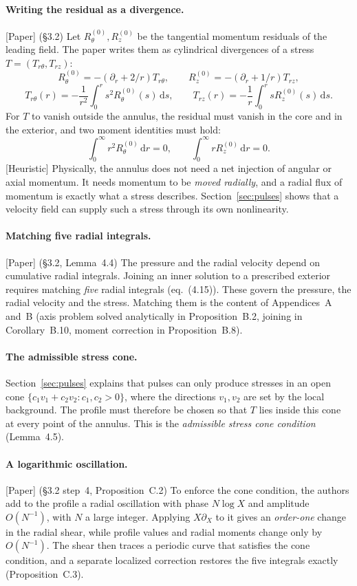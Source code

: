 \documentclass[11pt]{article}
\newcommand{\dd}{\,\mathrm{d}}
\theoremstyle{plain}
\theoremstyle{remark}
\newcommand{\paper}{\textsf{\small[Paper]}}
\newcommand{\heur}{\textsf{\small[Heuristic]}}
\begin{document}
\paragraph{Writing the residual as a divergence.} \paper{} (\S3.2) Let $R^{(0)}_\theta,R^{(0)}_z$ be the tangential momentum residuals of the leading field. The paper writes them as cylindrical divergences of a stress $T=(T_{r\theta},T_{rz})$:
\[
R^{(0)}_\theta=-(\partial_r+2/r)T_{r\theta},\qquad R^{(0)}_z=-(\partial_r+1/r)T_{rz},
\]
\[
T_{r\theta}(r)=-\frac1{r^2}\int_0^r s^2R^{(0)}_\theta(s)\dd s,\qquad T_{rz}(r)=-\frac1r\int_0^r sR^{(0)}_z(s)\dd s .
\]
For $T$ to vanish outside the annulus, the residual must vanish in the core and in the exterior, and two moment identities must hold:
\[
\int_0^\infty r^2R^{(0)}_\theta\dd r=0,\qquad \int_0^\infty rR^{(0)}_z\dd r=0 .
\]
\heur{} Physically, the annulus does not need a net injection of angular or axial momentum. It needs momentum to be \emph{moved radially}, and a radial flux of momentum is exactly what a stress describes. Section~\ref{sec:pulses} shows that a velocity field can supply such a stress through its own nonlinearity.

\paragraph{Matching five radial integrals.} \paper{} (\S3.2, Lemma~4.4) The pressure and the radial velocity depend on cumulative radial integrals. Joining an inner solution to a prescribed exterior requires matching \emph{five} radial integrals (eq.~(4.15)). These govern the pressure, the radial velocity and the stress. Matching them is the content of Appendices~A and~B (axis problem solved analytically in Proposition~B.2, joining in Corollary~B.10, moment correction in Proposition~B.8).

\paragraph{The admissible stress cone.} Section~\ref{sec:pulses} explains that pulses can only produce stresses in an open cone $\{c_1v_1+c_2v_2:c_1,c_2>0\}$, where the directions $v_1,v_2$ are set by the local background. The profile must therefore be chosen so that $T$ lies inside this cone at every point of the annulus. This is the \emph{admissible stress cone condition} (Lemma~4.5).

\paragraph{A logarithmic oscillation.} \paper{} (\S3.2 step~4, Proposition~C.2) To enforce the cone condition, the authors add to the profile a radial oscillation with phase $N\log X$ and amplitude $O(N^{-1})$, with $N$ a large integer. Applying $X\partial_X$ to it gives an \emph{order-one} change in the radial shear, while profile values and radial moments change only by $O(N^{-1})$. The shear then traces a periodic curve that satisfies the cone condition, and a separate localized correction restores the five integrals exactly (Proposition~C.3).
\end{document}
